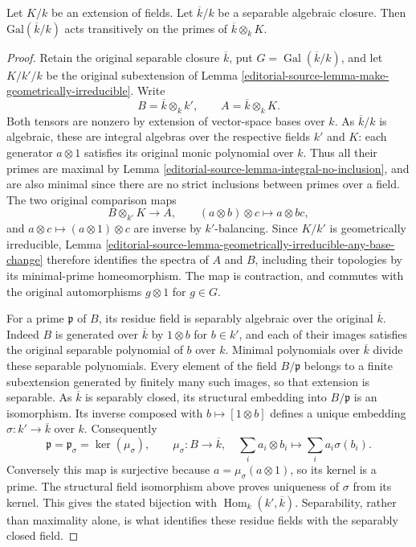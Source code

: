 \begin{lemma}
\label{editorial-source-lemma-Galois-orbit}
Let $K/k$ be an extension of fields.
Let $\overline{k}/k$ be a separable algebraic closure.
Then $\text{Gal}(\overline{k}/k)$ acts transitively on the
primes of $\overline{k} \otimes_k K$.
\end{lemma}

\begin{proof}
Retain the original separable closure
$\overline k$, put $G=\operatorname{Gal}(\overline k/k)$,
and let $K/k'/k$ be the original
subextension of Lemma
\ref{editorial-source-lemma-make-geometrically-irreducible}.
Write
$$
B=\overline k\otimes_k k',\qquad
A=\overline k\otimes_k K.
$$
Both tensors are nonzero by extension
of vector-space bases over $k$.
As $\overline k/k$ is algebraic,
these are integral algebras over
the respective fields $k'$ and
$K$: each generator $a\otimes1$
satisfies its original monic
polynomial over $k$. Thus all
their primes are maximal by
Lemma \ref{editorial-source-lemma-integral-no-inclusion},
and are also minimal since
there are no strict inclusions
between primes over a field.
The two original comparison maps
$$
B\otimes_{k'}K\longrightarrow A,
\qquad(a\otimes b)\otimes c\longmapsto a\otimes bc,
$$
and $a\otimes c\mapsto(a\otimes1)\otimes c$
are inverse by $k'$-balancing.
Since $K/k'$ is geometrically
irreducible, Lemma
\ref{editorial-source-lemma-geometrically-irreducible-any-base-change}
therefore identifies the spectra
of $A$ and $B$, including their
topologies by its minimal-prime
homeomorphism. The map is
contraction, and commutes with
the original automorphisms
$g\otimes1$ for $g\in G$.

For a prime $\mathfrak p$ of $B$,
its residue field is separably
algebraic over the original
$\overline k$. Indeed $B$ is
generated over $\overline k$ by
$1\otimes b$ for $b\in k'$,
and each of their images satisfies
the original separable polynomial
of $b$ over $k$. Minimal
polynomials over $\overline k$
divide these separable polynomials.
Every element of the field
$B/\mathfrak p$ belongs to a
finite subextension generated
by finitely many such images,
so that extension is separable.
As $\overline k$ is separably
closed, its structural embedding
into $B/\mathfrak p$ is an
isomorphism. Its inverse composed
with $b\mapsto[1\otimes b]$
defines a unique embedding
$\sigma:k'\to\overline k$ over $k$.
Consequently
$$
\mathfrak p=\mathfrak p_\sigma
=\ker(\mu_\sigma),\qquad
\mu_\sigma:B\to\overline k,\quad
\sum_i a_i\otimes b_i\longmapsto\sum_i a_i\sigma(b_i).
$$
Conversely this map is surjective
because $a=\mu_\sigma(a\otimes1)$,
so its kernel is a prime. The
structural field isomorphism
above proves uniqueness of
$\sigma$ from its kernel.
This gives the stated bijection
with $\operatorname{Hom}_k(k',\overline k)$.
Separability, rather than
maximality alone, is what
identifies these residue fields
with the separably closed field.


\end{proof}
